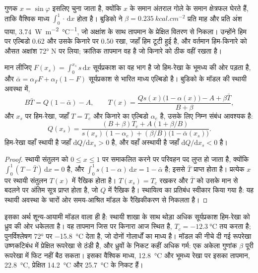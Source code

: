 गुणक $x = \sin\varphi$ इसलिए चुना जाता है, क्योंकि $x$ के समान अंतराल
गोले के समान क्षेत्रफल घेरते हैं, ताकि वैश्विक माध्य $\int_0^1\cdot\,\mathrm
dx$ होता है। बुडिको ने $\beta = \qty{0.235}{kcal.cm^{-2}}$ प्रति माह और प्रति अंश पाया,
\qty{3.74}{W.m^{-2}.\celsius^{-1}}, जो अक्षांश के साथ तापमान के प्रेक्षित
वितरण से निकला। उन्होंने हिम पर एल्बिडो 0.62 और उसके किनारे पर 0.50 रखा,
जहाँ हिम टूटी हुई है, और वर्तमान हिम-किनारे को औसत
अक्षांश \ang{72} N पर लिया; क्रांतिक तापमान वह है जो किनारे को
ठीक वहीं रखता है।

\begin{proposition}[बुडिको के मॉडल की हिम-रेखा]\label{prop:b3:climate-models:iceline}
मान लीजिए $F(x_s) = \int_0^{x_s}s\,\mathrm dx$ सूर्यप्रकाश का वह भाग है जो
हिम-रेखा के भूमध्य की ओर पड़ता है, और $\bar\alpha = \alpha_FF + \alpha_I(1 -
F)$ सूर्यप्रकाश से भारित माध्य एल्बिडो है। बुडिको के
मॉडल की स्थायी अवस्था में,
\[
B\bar T = Q(1 - \bar\alpha) - A, \qquad
T(x) = \frac{Qs(x)\big(1 - \alpha(x)\big) - A + \beta\bar T}{B + \beta} ,
\]
और $x_s$ पर हिम-रेखा, जहाँ $T = T_c$ और किनारे का एल्बिडो $\alpha_e$ है,
उसके लिए निम्न संबंध आवश्यक है:
\[
Q(x_s) = \frac{(B + \beta)T_c + A(1 + \beta/B)}{s(x_s)(1 - \alpha_e) +
(\beta/B)\big(1 - \bar\alpha(x_s)\big)} .
\]
हिम-रेखा वहाँ स्थायी है जहाँ $\mathrm dQ/\mathrm dx_s > 0$ है, और
वहाँ अस्थायी है जहाँ $\mathrm dQ/\mathrm dx_s < 0$ है।
\end{proposition}

\begin{proof}
स्थायी संतुलन को $0 \le x \le 1$ पर समाकलित करने पर परिवहन पद
लुप्त हो जाता है, क्योंकि $\int_0^1(T - \bar T)\,\mathrm dx = 0$ है, और $\int_0^1
s(1 - \alpha)\,\mathrm dx = 1 - \bar\alpha$ है; इससे $\bar T$ प्राप्त होता है। प्रत्येक
$x$ पर स्थायी संतुलन $T(x)$ में रैखिक होता है। $T(x_s) = T_c$ रखकर
और $\bar T$ को उसके मान से बदलने पर अंतिम सूत्र प्राप्त होता है, जो $Q$ में रैखिक है।
स्थायित्व का प्रतिबंध स्वीकार किया गया है: यह स्थायी अवस्था के चारों ओर
समय-आश्रित मॉडल के रैखिकीकरण से निकलता है।
\end{proof}

इसका अर्थ शून्य-आयामी मॉडल वाला ही है: स्थायी शाखा के साथ
थोड़ा अधिक सूर्यप्रकाश हिम-रेखा को ध्रुव की ओर धकेलता है। वह तापमान
जिस पर किनारा आज स्थित है, $T_c = \qty{-12.3}{\celsius}$ तय करता है; पुनर्विश्लेषण
\ang{72} पर \qty{-15.8}{\celsius} देता है, जो दोनों
गोलार्धों का माध्य है। मॉडल की नीचे दी गई रूपरेखा उष्णकटिबंध में
प्रेक्षित रूपरेखा से ठंडी है, और ध्रुवों के निकट कहीं अधिक गर्म: एक अकेला गुणांक $\beta$
पूरी रूपरेखा में फिट नहीं बैठ सकता। इसका वैश्विक माध्य,
\qty{12.8}{\celsius} और भूमध्य रेखा पर इसका तापमान, \qty{22.8}{\celsius},
प्रेक्षित \qty{14.2}{\celsius} और \qty{25.7}{\celsius} के निकट हैं।

